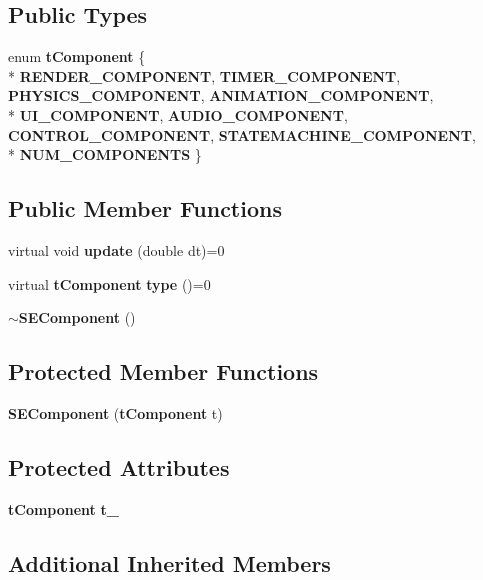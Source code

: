 \subsection*{Public Types}
\begin{DoxyCompactItemize}
\item 
enum {\bf t\+Component} \{ \\*
{\bf R\+E\+N\+D\+E\+R\+\_\+\+C\+O\+M\+P\+O\+N\+E\+N\+T}, 
{\bf T\+I\+M\+E\+R\+\_\+\+C\+O\+M\+P\+O\+N\+E\+N\+T}, 
{\bf P\+H\+Y\+S\+I\+C\+S\+\_\+\+C\+O\+M\+P\+O\+N\+E\+N\+T}, 
{\bf A\+N\+I\+M\+A\+T\+I\+O\+N\+\_\+\+C\+O\+M\+P\+O\+N\+E\+N\+T}, 
\\*
{\bf U\+I\+\_\+\+C\+O\+M\+P\+O\+N\+E\+N\+T}, 
{\bf A\+U\+D\+I\+O\+\_\+\+C\+O\+M\+P\+O\+N\+E\+N\+T}, 
{\bf C\+O\+N\+T\+R\+O\+L\+\_\+\+C\+O\+M\+P\+O\+N\+E\+N\+T}, 
{\bf S\+T\+A\+T\+E\+M\+A\+C\+H\+I\+N\+E\+\_\+\+C\+O\+M\+P\+O\+N\+E\+N\+T}, 
\\*
{\bf N\+U\+M\+\_\+\+C\+O\+M\+P\+O\+N\+E\+N\+T\+S}
 \}
\end{DoxyCompactItemize}
\subsection*{Public Member Functions}
\begin{DoxyCompactItemize}
\item 
virtual void {\bf update} (double dt)=0
\item 
virtual {\bf t\+Component} {\bf type} ()=0
\item 
{\bf $\sim$\+S\+E\+Component} ()
\end{DoxyCompactItemize}
\subsection*{Protected Member Functions}
\begin{DoxyCompactItemize}
\item 
{\bf S\+E\+Component} ({\bf t\+Component} t)
\end{DoxyCompactItemize}
\subsection*{Protected Attributes}
\begin{DoxyCompactItemize}
\item 
{\bf t\+Component} {\bf t\+\_\+}
\end{DoxyCompactItemize}
\subsection*{Additional Inherited Members}


